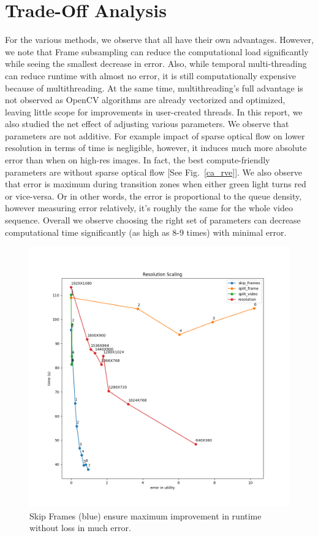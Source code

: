 \documentclass[conference]{IEEEtran}
\begin{document}
\section{Trade-Off Analysis}

For the various methods, we observe that all have their own advantages. However, we note that Frame subsampling can reduce the computational load significantly while seeing the smallest decrease in error.
Also, while temporal multi-threading can reduce runtime with almost no error, it is still computationally expensive because of multithreading. At the same time, multithreading's full advantage is not 
observed as OpenCV algorithms are already vectorized and optimized, leaving little scope for improvements in user-created threads.
In this report, we also studied the net effect of adjusting various parameters. We observe that parameters are not additive. For example impact of sparse optical flow on lower resolution in terms of time is negligible, however, it induces much more absolute error than when on high-res images.
In fact, the best compute-friendly parameters are without sparse optical flow [See Fig.~\ref{ca_rve}].
We also observe that error is maximum during transition zones when either green light turns red or vice-versa. Or in other words, the error is proportional to the queue density, however measuring error relatively, it's roughly the same for the whole video sequence. 
Overall we observe choosing the right set of parameters can decrease computational time significantly (as high as 8-9 times) with minimal error.


\begin{figure}[htbp]
\centerline{\includegraphics[scale=0.3]{plots/plot_all.png}}
\caption{Skip Frames (blue) ensure maximum improvement in runtime without loss in much error.}
\label{plot_all} 
\end{figure}
\end{document}
